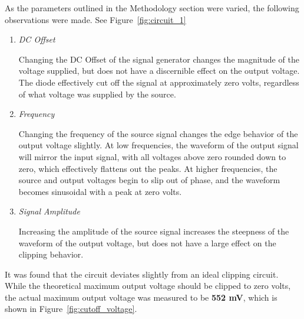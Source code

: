 \documentclass[twocolumn,english]{IEEEtran}
\begin{document}
As the parameters outlined in the Methodology section were varied, the following observations were made. See Figure~\ref{fig:circuit_1}

\begin{enumerate}

  \item \textit{DC Offset}

    Changing the DC Offset of the signal generator changes the magnitude of the voltage supplied, but does not have a discernible effect on the output voltage. The diode effectively cut off the signal at approximately zero volts, regardless of what voltage was supplied by the source. \\

  \item \textit{Frequency}

    Changing the frequency of the source signal changes the edge behavior of the output voltage slightly.
    At low frequencies, the waveform of the output signal will mirror the input signal, with all voltages above zero rounded down to zero, which effectively flattens out the peaks.
    At higher frequencies, the source and output voltages begin to slip out of phase, and the waveform becomes sinusoidal with a peak at zero volts. \\

  \item \textit{Signal Amplitude}

    Increasing the amplitude of the source signal increases the steepness of the waveform of the output voltage, but does not have a large effect on the clipping behavior.
\end{enumerate}

It was found that the circuit deviates slightly from an ideal clipping circuit. While the theoretical maximum output voltage should be clipped to zero volts, the actual maximum output voltage was measured to be \textbf{552 mV}, which is shown in Figure~\ref{fig:cutoff_voltage}.
\end{document}
